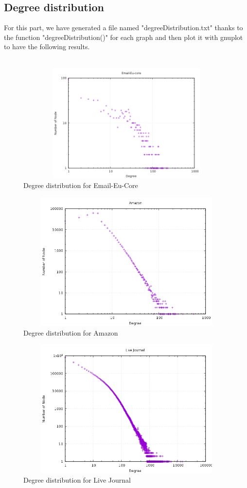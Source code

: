 \documentclass{article}
\begin{document}
\subsection{Degree distribution}
For this part, we have generated a file named "degreeDistribution.txt" thanks to the function "degreeDistribution()" for each graph and then plot it with gnuplot to have the following results.\\ \\
\begin{figure}[h!]
  \includegraphics[width=12cm, height=6cm]{email.png}
  \caption{Degree distribution for Email-Eu-Core}
\end{figure}
\FloatBarrier
\begin{figure}[h!]
  \includegraphics[width=12cm, height=7cm]{amazon.png}
  \caption{Degree distribution for Amazon}
\end{figure}
\FloatBarrier
\begin{figure}[h!]
  \includegraphics[width=12cm, height=7cm]{live_journal.png}
  \caption{Degree distribution for Live Journal}
\end{figure}
\end{document}
